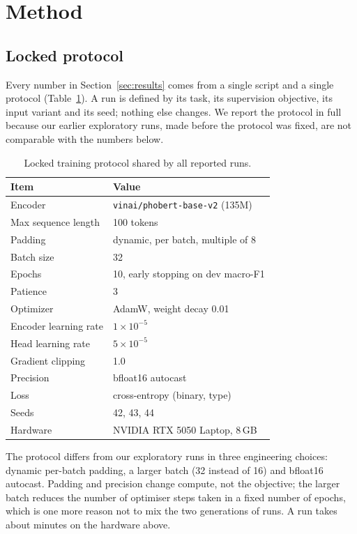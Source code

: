 \documentclass[12pt,a4paper]{article}
\begin{document}
\section{Method}
\subsection{Locked protocol}
Every number in Section~\ref{sec:results} comes from a single script and a single protocol (Table~\ref{tab:protocol}). A run is defined by its task, its supervision objective, its input variant and its seed; nothing else changes. We report the protocol in full because our earlier exploratory runs, made before the protocol was fixed, are not comparable with the numbers below.

\begin{table}[t]
\caption{Locked training protocol shared by all reported runs.}
\label{tab:protocol}
\centering
\small
\begin{tabular}{@{}ll@{}}
\toprule
Item & Value \\
\midrule
Encoder & \texttt{vinai/\allowbreak phobert-\allowbreak base-v2} (135M) \\
Max sequence length & 100 tokens \\
Padding & dynamic, per batch, multiple of 8 \\
Batch size & 32 \\
Epochs & 10, early stopping on dev macro-F1 \\
Patience & 3 \\
Optimizer & AdamW, weight decay 0.01 \\
Encoder learning rate & $1\times10^{-5}$ \\
Head learning rate & $5\times10^{-5}$ \\
Gradient clipping & 1.0 \\
Precision & bfloat16 autocast \\
Loss & cross-entropy (binary, type) \\
Seeds & 42, 43, 44 \\
Hardware & NVIDIA RTX 5050 Laptop, 8\,GB \\
\bottomrule
\end{tabular}
\end{table}

The protocol differs from our exploratory runs in three engineering choices: dynamic per-batch padding, a larger batch (32 instead of 16) and bfloat16 autocast. Padding and precision change compute, not the objective; the larger batch reduces the number of optimiser steps taken in a fixed number of epochs, which is one more reason not to mix the two generations of runs. A run takes about \RunMinutes{} minutes on the hardware above.
\end{document}
